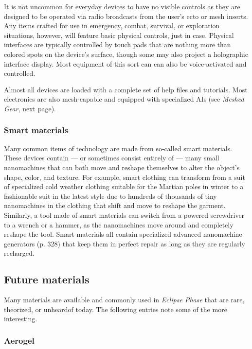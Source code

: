 It is not uncommon for everyday devices to have no visible controls as they are designed to be operated via radio broadcasts from the user’s ecto or mesh inserts. Any items crafted for use in emergency, combat, survival, or exploration situations, however, will feature basic physical controls, just in case. Physical interfaces are typically controlled by touch pads that are nothing more than colored spots on the device’s surface, though some may also project a holographic interface display. Most equipment of this sort can can also be voice-activated and controlled. 

Almost all devices are loaded with a complete set of help files and tutorials. Most electronics are also mesh-capable and equipped with specialized AIs (see \emph{Meshed Gear}, next page). 

\subsubsection{Smart materials} 

Many common items of technology are made from so-called smart materials. These devices contain --- or sometimes consist entirely of --- many small nanomachines that can both move and reshape themselves to alter the object’s shape, color, and texture. For example, smart clothing can transform from a suit of specialized cold weather clothing suitable for the Martian poles in winter to a fashionable suit in the latest style due to hundreds of thousands of tiny nanomachines in the clothing that shift and move to reshape the garment. Similarly, a tool made of smart materials can switch from a powered screwdriver to a wrench or a hammer, as the nanomachines move around and completely reshape the tool. Smart materials all contain specialized advanced nanomachine generators (p. 328) that keep them in perfect repair as long as they are regularly recharged. 



\subsection{Future materials} \label{sec:future-materials} 

Many materials are available and commonly used in \emph{Eclipse Phase} that are rare, theorized, or unheardof today. The following entries note some of the more interesting. 

\subsubsection{Aerogel} 

